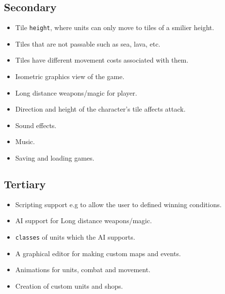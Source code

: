 \documentclass[11pt]{article}
\begin{document}
\subsection{Secondary}
\label{secondary}

\begin{itemize}
\item Tile \texttt{height}, where units can only move to tiles of a smilier height.

\item Tiles that are not passable such as sea, lava, etc.

\item Tiles have different movement costs associated with them.

\item Isometric graphics view of the game.

\item Long distance weapons\slash magic for player.

\item Direction and height of the character's tile affects attack.

\item Sound effects.

\item Music.

\item Saving and loading games.

\end{itemize}

\subsection{Tertiary}
\label{tertiary}

\begin{itemize}
\item Scripting support e.g to allow the user to defined winning conditions.

\item AI support for Long distance weapons\slash magic.

\item \texttt{classes} of units which the AI supports.

\item A graphical editor for making custom maps and events.

\item Animations for units, combat and movement.

\item Creation of custom units and shops.

\end{itemize}
\end{document}
